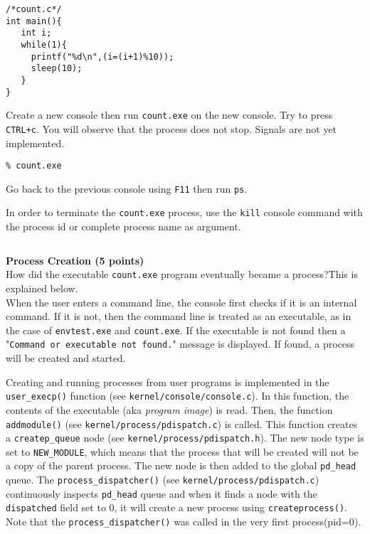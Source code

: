 \documentclass[a4paper, 11pt,oneside]{article}
\begin{document}
\begin{Verbatim}[frame=single]
/*count.c*/
int main(){
   int i;
   while(1){
     printf("%d\n",(i=(i+1)%10));
     sleep(10);   
   }
}
\end{Verbatim}

Create a new console then run \texttt{count.exe} on the new console. Try to press \texttt{CTRL+c}. 
You will observe that the process does not stop. Signals are not yet implemented. 

\begin{Verbatim}[frame=single]
% newconsole
% count.exe
\end{Verbatim}

Go back to the previous console using \texttt{F11} then run \texttt{ps}.

\noindent{}

In order to terminate the \texttt{count.exe} process, use the \texttt{kill} console command with the 
process id or complete process name as argument.
\begin{Verbatim}[frame=single]
% kill count.exe
\end{Verbatim}
\textbf{Process Creation (5 points)} \\ 

How did the executable \texttt{count.exe} program eventually became a process?This is explained below.\\

When the user enters a command line, the console first checks if it is an internal command. 
If it is not, then the command line is treated as an executable, as in the case of 
\texttt{envtest.exe} and \texttt{count.exe}. If the executable is not found then a "\texttt{Command or executable not found.}" message is displayed. If found, a process will be created and started. 

Creating and running processes from user programs is implemented in the \texttt{user\_execp()} function (see \texttt{kernel/console/console.c}). In this function, the contents of the executable (aka \textit{program image}) is read. Then, the function \texttt{addmodule()} (see \texttt{kernel/process/pdispatch.c}) is called. 
This function creates a \texttt{createp\_queue} node (see \texttt{kernel/process/pdispatch.h}). The new node type is set to \texttt{NEW\_MODULE}, which means that the process that will be created will not be a copy of the parent process. The new node is then added to the global \texttt{pd\_head} queue. The \texttt{process\_dispatcher()} (see \texttt{kernel/process/pdispatch.c}) continuously inspects \texttt{pd\_head} queue and when it finds a node with  the \texttt{dispatched} field set to 0, it will create a new process using \texttt{createprocess()}. Note that the \texttt{process\_dispatcher()} was called in the very first process(pid=0).  
\end{document}
